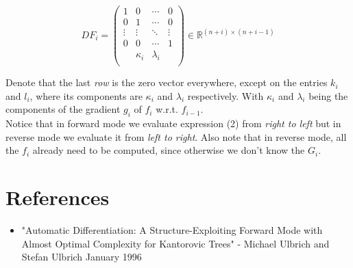 \documentclass[11pt,a4paper]{article}
\def\R{{\mathbb R}}
\theoremstyle{definition} %
\begin{document}
\[
	DF_i =
	\begin{pmatrix}
		1      & 0        & \cdots    & 0      \\
		0      & 1        & \cdots    & 0      \\
		\vdots & \vdots   & \ddots    & \vdots \\
		0      & 0        & \cdots    & 1      \\
		       & \kappa_i & \lambda_i &        \\
	\end{pmatrix}
	\in
	\R^{(n+i) \times (n+i-1)}
\]

Denote that the last \textit{row} is the zero vector everywhere,
except on the entries $k_i$ and  $l_i$, where its components are
$\kappa_i$ and $\lambda_i$ respectively. With  $\kappa_i$ and
$\lambda_i$ being the components of the gradient $g_i$ of $f_i$
w.r.t. $f_{i-1}$.
\\

Notice that in forward mode we evaluate expression (2) from
\textit{right to left} but in reverse mode we evaluate it from
\textit{left to right}. Also note that in reverse mode,
all the $f_i$ already need to be computed, since otherwise
we don't know the $G_i$.

\section{References}
\begin{itemize}
	\item "Automatic Differentiation: A Structure-Exploiting Forward
	      Mode with Almost Optimal Complexity for Kantorovic Trees"
	      - Michael Ulbrich and Stefan Ulbrich January 1996
\end{itemize}
\end{document}

